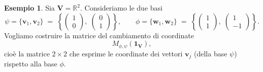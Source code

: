 \documentclass{article}
\theoremstyle{plain}
\theoremstyle{definition}
\newtheorem{exmp}{Esempio}[section]
\theoremstyle{remark}
\begin{document}
\begin{exmp}
Sia \(\mathbf{V} = \mathbb{R}^2\). Consideriamo le due basi
\[
\psi = \bigl\{\mathbf{v}_1, \mathbf{v}_2\bigr\} 
\;=\; \left\{\begin{pmatrix}1\\0\end{pmatrix},\;\begin{pmatrix}0\\1\end{pmatrix}\right\},
\qquad
\phi = \bigl\{\mathbf{w}_1, \mathbf{w}_2\bigr\} 
\;=\; \left\{\begin{pmatrix}1\\1\end{pmatrix},\;\begin{pmatrix}1\\-1\end{pmatrix}\right\}.
\]
Vogliamo costruire la matrice del cambiamento di coordinate 
\[
M_{\phi,\psi}(\mathbf{1_V}),
\]
cioè la matrice \(2\times2\) che esprime le coordinate dei vettori \(\mathbf{v}_j\) (della base \(\psi\)) rispetto alla base \(\phi\).


\end{exmp}
\end{document}
